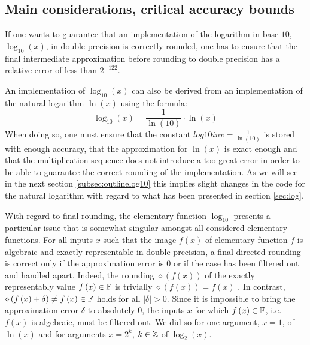 \subsection{Main considerations, critical accuracy bounds}\label{subsec:criticalboundslog10}
% 
If one wants to guarantee that an implementation of the logarithm in
base $10$, $\log_{10}\left( x \right)$, in double precision is
correctly rounded, one has to ensure that the final intermediate
approximation before rounding to double precision has a relative error
of less than $2^{-122}$.

An implementation of $\log_{10}\left(x\right)$ can also be derived from an
implementation of the natural logarithm $\ln\left(x\right)$ using the formula:
$$\log_{10}\left( x \right) = \frac{1}{\ln\left( 10 \right)} \cdot
\ln\left( x \right)$$ When doing so, one must ensure that the constant
$\mathit{log10inv} = \frac{1}{\ln\left(10\right)}$ is stored with
enough accuracy, that the approximation for $\ln\left( x \right)$ is
exact enough and that the multiplication sequence does not introduce a
too great error in order to be able to guarantee the correct rounding
of the implementation. As we will see in the next section
\ref{subsec:outlinelog10} this implies slight changes in the code for
the natural logarithm with regard to what has been presented in
section \ref{sec:log}.

With regard to final rounding, the elementary function $\log_{10}$
presents a particular issue that is somewhat singular amongst all
considered elementary functions. For all inputs $x$ such that the
image $f\left(x\right)$ of elementary function $f$ is algebraic and
exactly representable in double precision, a final directed rounding
is correct only if the approximation error is $0$ or if the case has
been filtered out and handled apart. Indeed, the rounding
$\diamond\left( f\left( x \right) \right)$ of the exactly
representably value $f\left(x\right) \in \mathbb {F}$ is trivially
$\diamond\left( f\left( x \right) \right) = f\left( x \right)$
\cite{IEEE754}. In contrast, $\diamond\left( f\left( x \right) +
\delta \right) \not = f\left( x \right) \in \mathbb {F}$ holds for all $\left
\vert \delta \right \vert > 0$. Since it is impossible to bring the
approximation error $\delta$ to absolutely $0$, the inputs $x$ for
which $f\left(x\right) \in \mathbb {F}$, i.e. $f\left(x\right)$ is algebraic,
must be filtered out. We did so for one argument, $x=1$, of $\ln\left(
x \right)$ and for arguments $x = 2^k$, $k \in \mathbb {Z}$ of $\log_2\left(
x\right)$.


